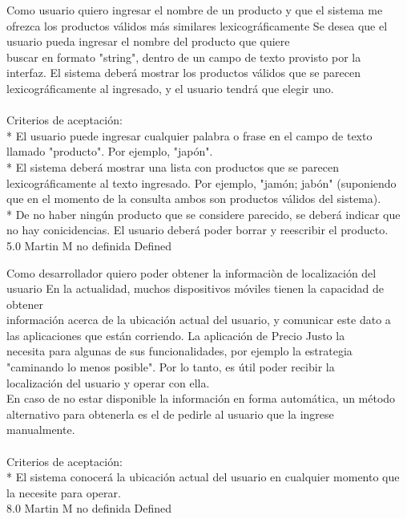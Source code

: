 	{Como usuario quiero ingresar el nombre de un producto y que el sistema me ofrezca los productos válidos más similares lexicográficamente} %
	{Se desea que el usuario pueda ingresar el nombre del producto que quiere\\
buscar en formato "string", dentro de un campo de texto provisto por la\\
interfaz. El sistema deberá mostrar los productos válidos que se parecen\\
lexicográficamente al ingresado, y el usuario tendrá que elegir uno.\\
  \\
Criterios de aceptación:\\
* El usuario puede ingresar cualquier palabra o frase en el campo de texto llamado "producto". Por ejemplo, "japón".  \\
* El sistema deberá mostrar una lista con productos que se parecen lexicográficamente al texto ingresado. Por ejemplo, "jamón; jabón" (suponiendo que en el momento de la consulta ambos son productos válidos del sistema).  \\
* De no haber ningún producto que se considere parecido, se deberá indicar que no hay conicidencias. El usuario deberá poder borrar y reescribir el producto.\\
} %
	{} %
	{5.0} %
	{Martin M} %
	{no definida} %
	{Defined} %


\vspace{20pt}

	{Como desarrollador quiero poder obtener la informaciòn de localización del usuario} %
	{En la actualidad, muchos dispositivos móviles tienen la capacidad de obtener\\
información acerca de la ubicación actual del usuario, y comunicar este dato a\\
las aplicaciones que están corriendo. La aplicación de Precio Justo la\\
necesita para algunas de sus funcionalidades, por ejemplo la estrategia\\
"caminando lo menos posible". Por lo tanto, es útil poder recibir la\\
localización del usuario y operar con ella.\\
En caso de no estar disponible la información en forma automática, un método\\
alternativo para obtenerla es el de pedirle al usuario que la ingrese\\
manualmente.\\
  \\
Criterios de aceptación:\\
* El sistema conocerá la ubicación actual del usuario en cualquier momento que la necesite para operar.\\
} %
	{} %
	{8.0} %
	{Martin M} %
	{no definida} %
	{Defined} %



